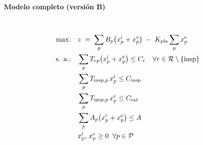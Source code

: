 \paragraph{Modelo completo (versión B)}\mbox{}\\
\begin{align}
\mbox{max.}\quad
& z \;=\; \sum_{p} B_p\big(x_p^{\mathrm{i}} + x_p^{\mathrm{e}}\big) \;-\; K_{\mathrm{pla}}\sum_{p} x_p^{\mathrm{e}} \notag\\
\mbox{s. a.:}\quad
& \sum_{p} T_{rp}\big(x_p^{\mathrm{i}} + x_p^{\mathrm{e}}\big) \le C_r \quad \forall r \in \mathcal{R}\setminus\{\mathrm{insp}\} \notag\\
& \sum_{p} T_{\mathrm{insp},p}\,x_p^{\mathrm{i}} \le C_{\mathrm{insp}} \notag\\
& \sum_{p} T_{\mathrm{insp},p}\,x_p^{\mathrm{e}} \le C_{\mathrm{ext}} \notag\\
& \sum_{p} A_p\big(x_p^{\mathrm{i}} + x_p^{\mathrm{e}}\big) \le A \notag\\
& x_p^{\mathrm{i}},\,x_p^{\mathrm{e}} \ge 0 \;\; \forall p \in \mathcal{P} \notag
\end{align}
